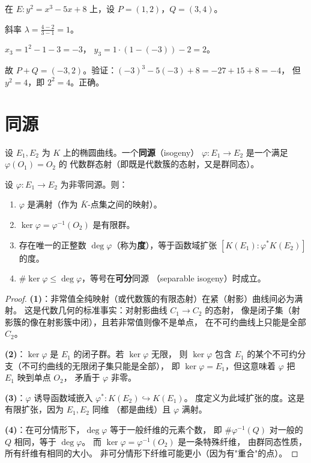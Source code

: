 \begin{example}
\label{ex:group-law-computation}
在 $E\colon y^2 = x^3 - 5x + 8$ 上，设 $P = (1, 2)$，$Q = (3, 4)$。

斜率 $\lambda = \frac{4 - 2}{3 - 1} = 1$。

$x_3 = 1^2 - 1 - 3 = -3$，
$y_3 = 1 \cdot (1 - (-3)) - 2 = 2$。

故 $P + Q = (-3, 2)$。验证：$(-3)^3 - 5(-3) + 8 = -27 + 15 + 8 = -4$，
但 $y^2 = 4$，即 $2^2 = 4$。正确。
\end{example}


\section{同源}
\label{sec:isogeny}

\begin{definition}[同源]
\label{def:isogeny}
设 $E_1, E_2$ 为 $K$ 上的椭圆曲线。一个\textbf{同源}（isogeny）
$\varphi\colon E_1 \to E_2$ 是一个满足 $\varphi(O_1) = O_2$ 的
代数群态射（即既是代数簇的态射，又是群同态）。
\end{definition}

\begin{proposition}
\label{prop:isogeny-properties}
设 $\varphi\colon E_1 \to E_2$ 为非零同源。则：
\begin{enumerate}
  \item $\varphi$ 是满射（作为 $\bar{K}$-点集之间的映射）。
  \item $\ker \varphi = \varphi^{-1}(O_2)$ 是有限群。
  \item 存在唯一的正整数 $\deg \varphi$（称为\textbf{度}），等于函数域扩张
    $[K(E_1) : \varphi^* K(E_2)]$ 的度。
  \item $\#\ker \varphi \leq \deg \varphi$，等号在\textbf{可分}同源
    （separable isogeny）时成立。
\end{enumerate}
\end{proposition}

\begin{proof}
\textbf{(1)}：非常值全纯映射（或代数簇的有限态射）在紧（射影）曲线间必为满射。
这是代数几何的标准事实：对射影曲线 $C_1 \to C_2$ 的态射，
像是闭子集（射影簇的像在射影簇中闭），且若非常值则像不是单点，
在不可约曲线上只能是全部 $C_2$。

\textbf{(2)}：$\ker \varphi$ 是 $E_1$ 的闭子群。若 $\ker \varphi$ 无限，
则 $\ker \varphi$ 包含 $E_1$ 的某个不可约分支（不可约曲线的无限闭子集只能是全部），
即 $\ker \varphi = E_1$，但这意味着 $\varphi$ 把 $E_1$ 映到单点 $O_2$，
矛盾于 $\varphi$ 非零。

\textbf{(3)}：$\varphi$ 诱导函数域嵌入 $\varphi^*\colon K(E_2) \hookrightarrow K(E_1)$。
度定义为此域扩张的度。这是有限扩张，因为 $E_1, E_2$ 同维
（都是曲线）且 $\varphi$ 满射。

\textbf{(4)}：在可分情形下，$\deg \varphi$ 等于一般纤维的元素个数，
即 $\#\varphi^{-1}(Q)$ 对一般的 $Q$ 相同，等于 $\deg \varphi$。
而 $\ker \varphi = \varphi^{-1}(O_2)$ 是一条特殊纤维，
由群同态性质，所有纤维有相同的大小。
非可分情形下纤维可能更小（因为有"重合"的点）。
\end{proof}


